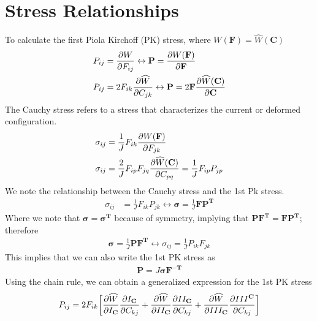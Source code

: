 \documentclass[12pt,3p]{article}
\begin{document}
\section{Stress Relationships}
\vspace{-2ex}
To calculate the first Piola Kirchoff (PK) stress, where $W(\mathbf{F})  = \widehat{W} (\mathbf{C})$
\begin{subequations}\label{Eq1PK}
\begin{align}
P_{ij} &= \pdv{W}{F_{ij}} \leftrightarrow \mathbf{P} = \pdv{W (\mathbf{F})}{\mathbf{F}}\\
P_{ij} &= 2 F_{ik} \pdv{\widehat{W}}{C_{jk}} \leftrightarrow \mathbf{P} = 2 \mathbf{F} \pdv{\widehat{W} (\mathbf{C})}{\mathbf{C}}
\end{align}
\end{subequations}
The Cauchy stress refers to a stress that characterizes the current or deformed configuration. 
\begin{subequations}\label{EqCauchy}
\begin{align}
\sigma_{ij} &= \frac{1}{J} F_{ik} \pdv{W (\mathbf{F})}{F_{jk}} \\
\sigma_{ij} &= \frac{2}{J} F_{ip} F_{jq} \pdv{\widehat{W} (\mathbf{C})}{C_{pq}} = \frac{1}{J} F_{ip} P_{jp}
\end{align}
\end{subequations}
We note the relationship between the Cauchy stress and the 1st Pk stress. 
\begin{align*}
\sigma_{ij} &= \frac{1}{J} F_{ik} P_{jk} \leftrightarrow \bm{\sigma} = \frac{1}{J} \mathbf{F} \mathbf{P^{T}}
\end{align*}
Where we note that $\bm{\sigma} = \bm{\sigma^T}$ because of symmetry, implying that $\mathbf{P} \mathbf{F^T} = \mathbf{F} \mathbf{P^T}$; therefore
\begin{align}\label{EqCauchyAlt}
\bm{\sigma} = \frac{1}{J} \mathbf{P} \mathbf{F^T} \leftrightarrow \sigma_{ij} = \frac{1}{J} P_{ik} F_{jk}
\end{align}
This implies that we can also write the 1st PK stress as 
\begin{align}\label{Eq1PKAlt}
\mathbf{P} = J \bm{\sigma} \mathbf{F^{-T}}
\end{align}
Using the chain rule, we can obtain a generalized expression for the 1st PK stress 
\begin{equation}\label{Eq1PKChain}
P_{ij} =  2 F_{ik} \bigg[ \pdv{\widehat{W}}{I_\mathbf{C}} \pdv{I_\mathbf{C}}{C_{kj}} 
	+ \pdv{\widehat{W}}{II_\mathbf{C}} \pdv{II_\mathbf{C}}{C_{kj}} 
	+ \pdv{\widehat{W}}{III_\mathbf{C}} \pdv{III^\mathbf{C}}{C_{kj}} \bigg]
\end{equation}
\end{document}

